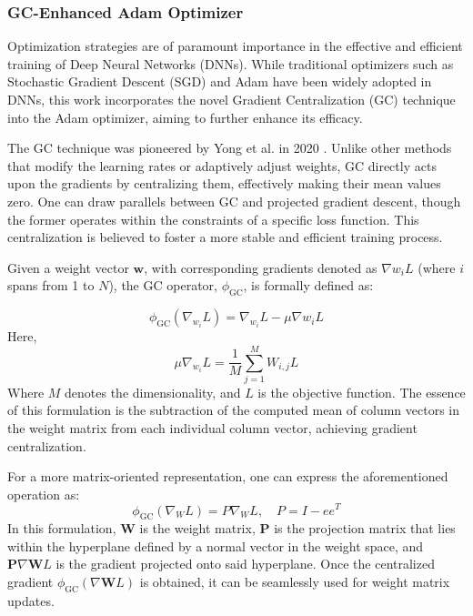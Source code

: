 \documentclass[sn-mathphys,Numbered]{sn-jnl}
\theoremstyle{thmstyleone}%
\theoremstyle{thmstyletwo}%
\theoremstyle{thmstylethree}%
\begin{document}
\subsubsection{ GC-Enhanced Adam Optimizer}\label{subsec5}

Optimization strategies are of paramount importance in the effective and efficient training of Deep Neural Networks (DNNs). While traditional optimizers such as Stochastic Gradient Descent (SGD) and Adam have been widely adopted in DNNs, this work incorporates the novel Gradient Centralization (GC) technique into the Adam optimizer, aiming to further enhance its efficacy.

The GC technique was pioneered by Yong et al. in 2020 \cite{yong2020gradient}. Unlike other methods that modify the learning rates or adaptively adjust weights, GC directly acts upon the gradients by centralizing them, effectively making their mean values zero. One can draw parallels between GC and projected gradient descent, though the former operates within the constraints of a specific loss function. This centralization is believed to foster a more stable and efficient training process.

Given a weight vector \( \mathbf{w} \), with corresponding gradients denoted as \( \nabla w_i L \) (where \( i \) spans from 1 to \( N \)), the GC operator, \( \phi_{\text{GC}} \), is formally defined as:

\begin{equation}
\phi_{\text{GC}}\left(\nabla_{w_i} L\right) = \nabla_{w_i} L - \mu \nabla w_i L
\end{equation}
Here, 
\begin{equation}
\mu \nabla_{w_i} L = \frac{1}{M} \sum_{j=1}^M W_{i, j} L
\end{equation}
Where \( M \) denotes the dimensionality, and \( L \) is the objective function. The essence of this formulation is the subtraction of the computed mean of column vectors in the weight matrix from each individual column vector, achieving gradient centralization.

For a more matrix-oriented representation, one can express the aforementioned operation as:
\begin{equation}
\phi_{\text{GC}}\left(\nabla_W L\right) = P \nabla_W L, \quad P = I - e e^T
\end{equation}
In this formulation, \( \mathbf{W} \) is the weight matrix, \( \mathbf{P} \) is the projection matrix that lies within the hyperplane defined by a normal vector in the weight space, and \( \mathbf{P} \nabla \mathbf{W} L \) is the gradient projected onto said hyperplane. Once the centralized gradient \( \phi_{\text{GC}}(\nabla \mathbf{W} L) \) is obtained, it can be seamlessly used for weight matrix updates.
\end{document}

